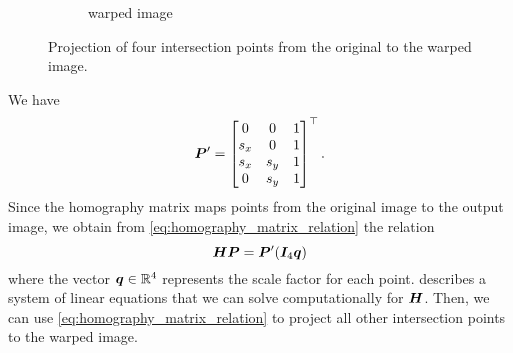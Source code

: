 \documentclass[../main.tex]{subfiles}
\begin{document}
\begin{figure}
\begin{subfigure}[t]{0.38\textwidth}
        \caption{warped image}
    \end{subfigure}
    \caption{Projection of four intersection points from the original to the warped image.}
    \label{fig:homography_illustration}
\end{figure}
We have
\begin{equation*}
    {\bm{P}}' = \begin{bmatrix}
        0 & 0 & 1 \\
        s_x & 0 & 1 \\
        s_x & s_y & 1 \\
        0 & s_y & 1
    \end{bmatrix}^\top.
\end{equation*}
Since the homography matrix maps points from the original image to the output image, we obtain from \cref{eq:homography_matrix_relation} the relation 
\begin{equation}
    \label{eq:homography_matrix_relation_corners}
    {\bm{H}} {\bm{P}} = {\bm{P}}' ({\bm{I}}_4 {\bm{q}})
\end{equation}
where the vector ${\bm{q}} \in \mathbb{R}^4$ represents the scale factor for each point.
 describes a system of linear equations that we can solve computationally for ${\bm{H}}$.
Then, we can use \cref{eq:homography_matrix_relation} to project all other intersection points to the warped image.
\end{document}
